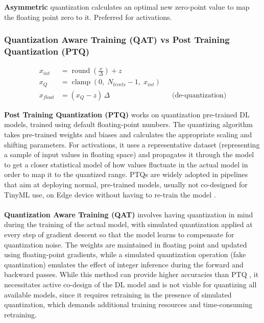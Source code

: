 \documentclass[12pt,DIV16,BCOR12mm,a4paper,footinclude=false,headinclude,parskip=half-,twoside,openright,cleardoublepage=empty,toc=index,bibliography=totoc,listof=totoc]{scrreprt}
\numberwithin{equation}{chapter}
\begin{document}
    \textbf{Asymmetric} quantization calculates an optimal new zero-point value to map the floating point zero to it. Preferred for activations.
    \subsubsection{Quantization Aware Training (QAT) vs Post Training Quantization (PTQ)}
    
    \begin{equation}
    \begin{aligned}
        x_{int} &= \operatorname{round}\!\left(\frac{x}{\Delta}\right) + z \\
        x_{Q} &= \operatorname{clamp}\!\left(0,\; N_{levels} - 1,\; x_{int}\right) \\
        x_{float} &= (x_{Q} - z)\,\Delta && \text{(de-quantization)}
    \end{aligned}
    \end{equation}

    \textbf{Post Training Quantization (PTQ)} works on quantization pre-trained DL models, trained using default floating-point numbers.
    The quantizing algorithm takes pre-trained weights and biases and calculates the appropriate scaling and shifting parameters. For activations,
    it uses a representative dataset (representing a sample of input values in floating space) and propagates it through the model to get a closer 
    statistical model of how values fluctuate in the actual model in order to map it to the quantized range. PTQs are widely adopted in pipelines 
    that aim at deploying normal, pre-trained models, usually not co-designed for TinyML use, on Edge device without having to re-train the model
    \cite{krishnamoorthiQuantizingDeepConvolutional2018,nagelWhitePaperNeural2021}.
    \\\\
    \textbf{Quantization Aware Training (QAT)} involves having quantization in mind
    during the training of the actual model, with simulated quantization applied at every
    step of gradient descent so that the model learns to compensate for quantization noise.
    The weights are maintained in floating point and updated using floating-point gradients,
    while a simulated quantization operation (fake quantization) emulates the effect of
    integer inference during the forward and backward passes. While this method can provide
    higher accuracies than PTQ \cite{krishnamoorthiQuantizingDeepConvolutional2018,nagelWhitePaperNeural2021}, it
    necessitates active co-design of the DL model and is not viable for quantizing all
    available models, since it requires retraining in the presence of simulated quantization,
    which demands additional training resources and time-consuming retraining.
\end{document}

